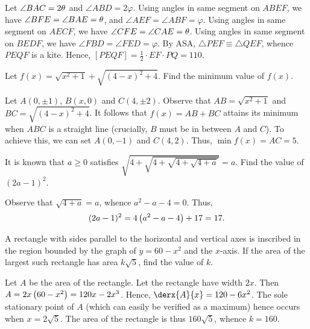 \begin{solution*}
    Let $\angle BAC = 2\theta$ and $\angle ABD = 2\varphi$. Using angles in same segment on $ABEF$, we have $\angle BFE = \angle BAE = \theta$, and $\angle AEF = \angle ABF = \varphi$. Using angles in same segment on $AECF$, we have $\angle CFE = \angle CAE = \theta$. Using angles in same segment on $BEDF$, we have $\angle FBD = \angle FED = \varphi$. By ASA, $\triangle PEF \equiv \triangle QEF$, whence $PEQF$ is a kite. Hence, $[PEQF] = \frac12 \cdot EF \cdot PQ = 110$.
\end{solution*}

\begin{question}[5]\label{Q::2024-O-1-8}
    Let $f(x) = \sqrt{x^2 + 1} + \sqrt{(4-x)^2 + 4}$. Find the minimum value of $f(x)$.
\end{question}
\begin{solution*}
    Let $A(0, \pm1)$, $B(x, 0)$ and $C(4, \pm2)$. Observe that  $AB = \sqrt{x^2 + 1}$ and $BC = \sqrt{(4-x)^2 + 4}$. It follows that $f(x) = AB + BC$ attains its minimum when $ABC$ is a straight line (crucially, $B$ must be in between $A$ and $C$). To achieve this, we can set $A(0, -1)$ and $C(4, 2)$. Thus, $\min f(x) = AC = 5$.
\end{solution*}

\begin{question}[17]\label{Q::2024-O-1-9}
    It is known that $a \geq 0$ satisfies $\sqrt{4 + \sqrt{4 + \sqrt{4 + \sqrt{4 + a}}}} = a$. Find the value of $(2a - 1)^2$.
\end{question}
\begin{solution*}
    Observe that $\sqrt{4 + a} = a$, whence $a^2 - a - 4 = 0$. Thus, \[(2a-1)^2 = 4\left( a^2 - a - 4 \right) + 17 = 17.\]
\end{solution*}

\begin{question}[160]\label{Q::2024-O-1-10}
    A rectangle with sides parallel to the horizontal and vertical axes is inscribed in the region bounded by the graph of $y = 60 - x^2$ and the $x$-axis. If the area of the largest such rectangle has area $k\sqrt 5$, find the value of $k$.
\end{question}
\begin{solution*}
    Let $A$ be the area of the rectangle. Let the rectangle have width $2x$. Then $A = 2x\left( 60 - x^2 \right) = 120x - 2x^3$. Hence, $\derx{A}{x} = 120 - 6x^2$. The sole stationary point of $A$ (which can easily be verified as a maximum) hence occurs when $x = 2\sqrt5$. The area of the rectangle is thus $160\sqrt5$, whence $k = 160$.
\end{solution*}


